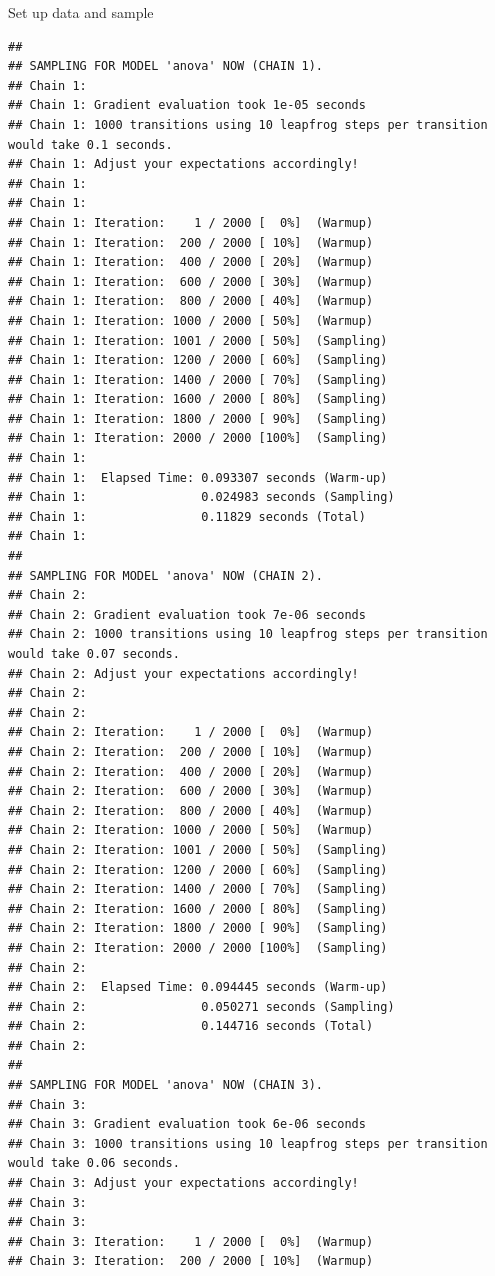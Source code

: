 \documentclass[
  ignorenonframetext,
]{beamer}
\begin{document}
\begin{frame}[fragile]{Set up data and sample}
\begin{verbatim}
## 
## SAMPLING FOR MODEL 'anova' NOW (CHAIN 1).
## Chain 1: 
## Chain 1: Gradient evaluation took 1e-05 seconds
## Chain 1: 1000 transitions using 10 leapfrog steps per transition would take 0.1 seconds.
## Chain 1: Adjust your expectations accordingly!
## Chain 1: 
## Chain 1: 
## Chain 1: Iteration:    1 / 2000 [  0%]  (Warmup)
## Chain 1: Iteration:  200 / 2000 [ 10%]  (Warmup)
## Chain 1: Iteration:  400 / 2000 [ 20%]  (Warmup)
## Chain 1: Iteration:  600 / 2000 [ 30%]  (Warmup)
## Chain 1: Iteration:  800 / 2000 [ 40%]  (Warmup)
## Chain 1: Iteration: 1000 / 2000 [ 50%]  (Warmup)
## Chain 1: Iteration: 1001 / 2000 [ 50%]  (Sampling)
## Chain 1: Iteration: 1200 / 2000 [ 60%]  (Sampling)
## Chain 1: Iteration: 1400 / 2000 [ 70%]  (Sampling)
## Chain 1: Iteration: 1600 / 2000 [ 80%]  (Sampling)
## Chain 1: Iteration: 1800 / 2000 [ 90%]  (Sampling)
## Chain 1: Iteration: 2000 / 2000 [100%]  (Sampling)
## Chain 1: 
## Chain 1:  Elapsed Time: 0.093307 seconds (Warm-up)
## Chain 1:                0.024983 seconds (Sampling)
## Chain 1:                0.11829 seconds (Total)
## Chain 1: 
## 
## SAMPLING FOR MODEL 'anova' NOW (CHAIN 2).
## Chain 2: 
## Chain 2: Gradient evaluation took 7e-06 seconds
## Chain 2: 1000 transitions using 10 leapfrog steps per transition would take 0.07 seconds.
## Chain 2: Adjust your expectations accordingly!
## Chain 2: 
## Chain 2: 
## Chain 2: Iteration:    1 / 2000 [  0%]  (Warmup)
## Chain 2: Iteration:  200 / 2000 [ 10%]  (Warmup)
## Chain 2: Iteration:  400 / 2000 [ 20%]  (Warmup)
## Chain 2: Iteration:  600 / 2000 [ 30%]  (Warmup)
## Chain 2: Iteration:  800 / 2000 [ 40%]  (Warmup)
## Chain 2: Iteration: 1000 / 2000 [ 50%]  (Warmup)
## Chain 2: Iteration: 1001 / 2000 [ 50%]  (Sampling)
## Chain 2: Iteration: 1200 / 2000 [ 60%]  (Sampling)
## Chain 2: Iteration: 1400 / 2000 [ 70%]  (Sampling)
## Chain 2: Iteration: 1600 / 2000 [ 80%]  (Sampling)
## Chain 2: Iteration: 1800 / 2000 [ 90%]  (Sampling)
## Chain 2: Iteration: 2000 / 2000 [100%]  (Sampling)
## Chain 2: 
## Chain 2:  Elapsed Time: 0.094445 seconds (Warm-up)
## Chain 2:                0.050271 seconds (Sampling)
## Chain 2:                0.144716 seconds (Total)
## Chain 2: 
## 
## SAMPLING FOR MODEL 'anova' NOW (CHAIN 3).
## Chain 3: 
## Chain 3: Gradient evaluation took 6e-06 seconds
## Chain 3: 1000 transitions using 10 leapfrog steps per transition would take 0.06 seconds.
## Chain 3: Adjust your expectations accordingly!
## Chain 3: 
## Chain 3: 
## Chain 3: Iteration:    1 / 2000 [  0%]  (Warmup)
## Chain 3: Iteration:  200 / 2000 [ 10%]  (Warmup)

\end{verbatim}
\end{frame}
\end{document}
